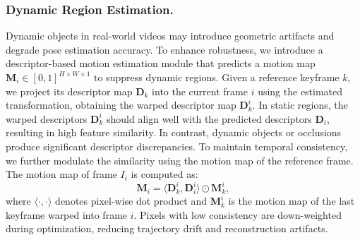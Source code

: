 
{\subsubsection{Dynamic Region Estimation.} Dynamic objects in real-world videos may introduce geometric artifacts and degrade pose estimation accuracy. To enhance robustness, we introduce a descriptor-based motion estimation module that predicts a motion map $\mathbf{M}_i \in [0,1]^{H \times W \times 1}$ to suppress dynamic regions. Given a reference keyframe $k$, we project its descriptor map $\mathbf{D}_k$ into the current frame $i$ using the estimated transformation, obtaining the warped descriptor map $\mathbf{D}_k^i$. In static regions, the warped descriptors $\mathbf{D}_k^i$ should align well with the predicted descriptors $\mathbf{D}_i$, resulting in high feature similarity. 
In contrast, dynamic objects or occlusions produce significant descriptor discrepancies. To maintain temporal consistency, we further modulate the similarity using the motion map of the reference frame. The motion map of frame $I_i$ is computed as:
\begin{equation}
\mathbf{M}_i = \langle \mathbf{D}_k^i, \mathbf{D}^i_i \rangle \odot \mathbf{M}_k^i,
\end{equation}
where $\langle \cdot, \cdot \rangle$ denotes pixel-wise dot product and $\mathbf{M}_k^i$ is the motion map of the last keyframe warped into frame $i$. Pixels with low consistency are down-weighted during optimization, reducing trajectory drift and reconstruction artifacts.

}
